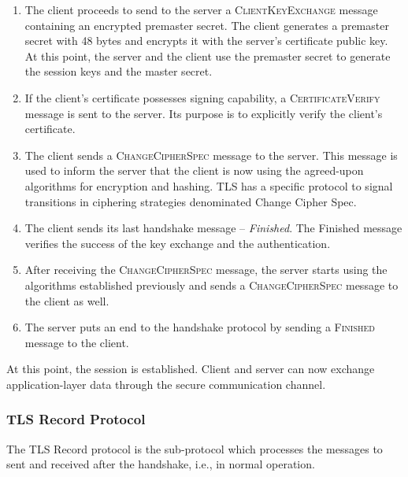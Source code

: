 \documentclass{sig-alternate-05-2015}
\newcommand{\msg}[1]{\textsc{{#1}}}
\begin{document}
\begin{enumerate}
\item {The client proceeds to send to the server a \msg{ClientKeyExchange} message containing an encrypted premaster secret. The client generates a premaster secret with 48 bytes and encrypts it with the server's certificate public key. At this point, the server and the client use the premaster secret to generate the session keys and the master secret.}

\item {If the client's certificate possesses signing capability, a \msg{CertificateVerify} message is sent to the server. Its purpose is to explicitly verify the client's certificate.}

\item {The client sends a \msg{ChangeCipherSpec} message to the server. This message is used to inform the server that the client is now using the agreed-upon algorithms for encryption and hashing. TLS has a specific protocol to signal transitions in ciphering strategies denominated Change Cipher Spec.
}

\item {The client  sends its last handshake message -- \textit{Finished}. The Finished message verifies the success of the key exchange and the authentication.}

\item {After receiving the \msg{ChangeCipherSpec} message, the server starts using the algorithms established previously and sends a \msg{ChangeCipherSpec} message to the client as well.}

\item {The server puts an end to the handshake protocol by sending a \msg{Finished} message to the client.}

\end{enumerate}

At this point, the session is established. Client and server can now exchange application-layer data through the secure communication channel.


\subsubsection{TLS Record Protocol}

The TLS Record protocol is the sub-protocol which processes the messages to sent and received after the handshake, i.e., in normal operation.
\end{document}
